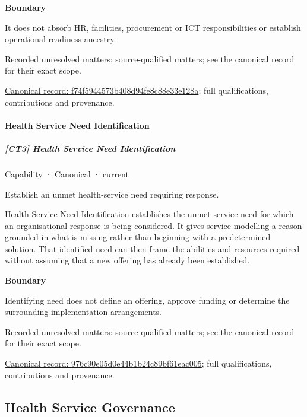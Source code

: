 \textbf{Boundary}



It does not absorb HR, facilities, procurement or ICT responsibilities or establish operational-readiness ancestry.


{\small Recorded unresolved matters: source-qualified matters; see the canonical record for their exact scope.}\par
{\footnotesize \href{../../../../continuum/strategy/capability/f74f5944573b408d94fe8c88e33e128a.md}{Canonical record: f74f5944573b408d94fe8c88e33e128a}; full qualifications, contributions and provenance.}\par
\paragraph{Health Service Need Identification}

\subparagraph{[CT3] Health Service Need Identification}

\label{element:976c90e05d0e44b1b24c89bf61eac005}
{\small Capability · Canonical · current}\par

Establish an unmet health-service need requiring response.



Health Service Need Identification establishes the unmet service need for which an organisational response is being considered. It gives service modelling a reason grounded in what is missing rather than beginning with a predetermined solution. That identified need can then frame the abilities and resources required without assuming that a new offering has already been established.



\textbf{Boundary}



Identifying need does not define an offering, approve funding or determine the surrounding implementation arrangements.


{\small Recorded unresolved matters: source-qualified matters; see the canonical record for their exact scope.}\par
{\footnotesize \href{../../../../continuum/strategy/capability/976c90e05d0e44b1b24c89bf61eac005.md}{Canonical record: 976c90e05d0e44b1b24c89bf61eac005}; full qualifications, contributions and provenance.}\par
\subsection{Health Service Governance}

